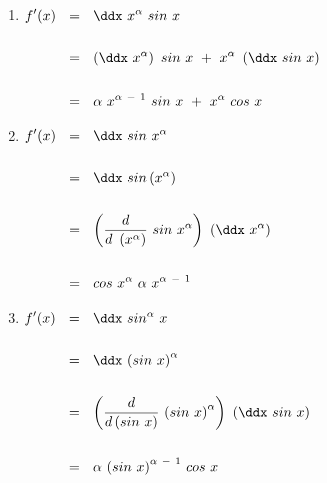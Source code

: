 




\chapter{~}



\newpage



\section{~} %

~\\

\begin{enumerate}[leftmargin=*, labelsep=3em, itemsep=3em, label=\alph*)]
	
	\item $\begin{aligned}[t]
	 f'(x) ~~ &= ~~ \ddx ~ x^{\alpha} ~ sin ~ x \\ \\
	 &= ~~ \left( \ddx ~ x^{\alpha} \right) ~ sin ~ x ~ + ~ x^{\alpha} ~ \left( \ddx ~ sin ~ x \right) \\ \\
	 &= ~~ \alpha ~ x^{\alpha ~ - ~ 1} ~ sin ~ x ~ + ~ x^{\alpha} ~ cos ~ x
	\end{aligned}$

	\item $\begin{aligned}[t]
	 f'(x) ~~ &= ~~ \ddx ~ sin ~ x^{\alpha} \\ \\
	 &= ~~ \ddx ~ sin \left( x^{\alpha} \right) \\ \\
	 &= ~~ \left( \frac{d}{d ~ \left( x^{\alpha}\right)} ~ sin ~ x^{\alpha} \right) ~ \left( \ddx ~ x^{\alpha} \right) \\ \\
	 &= ~~ cos ~ x^{\alpha} ~ \alpha ~ x^{\alpha ~ - ~ 1}
	\end{aligned}$
	
	\item $\begin{aligned}[t]
	 f'(x) ~~ &= ~~ \ddx ~ sin^{\alpha} ~ x \\ \\
	 &= ~~ \ddx ~ {\left( sin ~ x \right)}^{\alpha} \\ \\
	 &= ~~ \left( \frac{d}{d \left( sin ~ x \right)} ~ {\left( sin ~ x \right)}^{\alpha} \right) ~ \left( \ddx ~ sin ~ x \right) \\ \\
	 &= ~~ \alpha ~ {\left( sin ~ x \right)}^{\alpha ~ - ~ 1} ~ cos ~ x
	\end{aligned}$
	

\end{enumerate}

